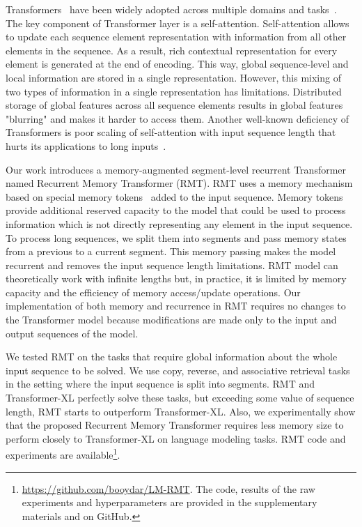   Transformers~\cite{vaswani2017attention} have been widely adopted across multiple domains and tasks~\cite{RadfordNarasimhanEtAl_2018_Improving_language_understanding_by_generative_pre-training, speech-transformer, devlin2019bert, dosovitskiy2021vit, dalle, jaegle2021perceiverio}.
  The key component of Transformer layer is a self-attention. Self-attention allows to update each sequence element representation  with information from all other elements in the sequence. As a result, rich contextual representation for every element is generated at the end of encoding. This way, global sequence-level and local information are stored in a single representation. However, this mixing of two types of information in a single representation has limitations. Distributed storage of global features across all sequence elements results in global features "blurring" and makes it harder to access them. Another well-known deficiency of Transformers is poor scaling of self-attention with input sequence length that hurts its applications to long inputs~\cite{child2019generating, guo2019startransformer, dai2019transformerxl, beltagy2020longformer, ainslie2020encoding, zaheer2020big, wang2020linformer, choromanski2020performer}.
  
  Our work introduces a memory-augmented segment-level recurrent Transformer named Recurrent Memory Transformer (RMT). RMT uses a memory mechanism based on special memory tokens~\cite{burtsev2020memory-transformer} added to the input sequence. Memory tokens provide additional reserved capacity to the model that could be used to process information which is not directly representing any element in the input sequence. To process long sequences, we split them into segments and pass memory states from a previous to a current segment. This memory passing makes the model recurrent and removes the input sequence length limitations. RMT model can theoretically work with infinite lengths but, in practice, it is limited by memory capacity and the efficiency of memory access/update operations. Our implementation of both memory and recurrence in RMT requires no changes to the Transformer model because modifications are made only to the input and output sequences of the model.
  
  We tested RMT on the tasks that require global information about the whole input sequence to be solved. We use copy, reverse, and associative retrieval tasks in the setting where the input sequence is split into segments. RMT and Transformer-XL perfectly solve these tasks, but exceeding some value of sequence length, RMT starts to outperform Transformer-XL. Also, we experimentally show that the proposed Recurrent Memory Transformer requires less memory size to perform closely to Transformer-XL on language modeling tasks. RMT code and experiments are available\footnote{\url{https://github.com/booydar/LM-RMT}. The code, results of the raw experiments and hyperparameters are provided in the supplementary materials and on GitHub.}.
  
